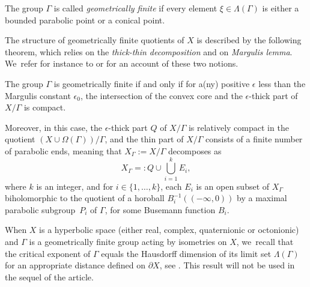 \begin{definition}
The group $\Gamma$ is called \textit{geometrically finite} if every element $\xi\in\Lambda(\Gamma)$ is either a bounded parabolic point or a conical point.
\end{definition}

The structure of geometrically finite quotients of $X$ is described by the following theorem, which relies on the \textit{thick-thin decomposition} and on \textit{Margulis lemma}. We~refer for instance to \cite[Ch.\,D]{benedettiLecturesHyperbolicGeometry1992} or \cite[\S 3.5]{bowditchGeometricalFinitenessVariable1995} for an account of these two notions.

\begin{theorem*}
The group $\Gamma$ is geometrically finite if and only if for a(ny) positive $\epsilon$ less than the Margulis constant $\epsilon_0$, the intersection of the convex core and the $\epsilon$-thick part of $X/\Gamma$ is compact.

Moreover, in this case, the $\epsilon$-thick part $Q$ of $X/\Gamma$ is relatively compact in the quotient $\left(X\cup \Omega(\Gamma)\right)/\Gamma$, and the thin part of $X/\Gamma$ consists of a finite number of parabolic ends, meaning that $X_{\Gamma}:=X/\Gamma$ decomposes as
\begin{equation}\label{eq-decompo-GF}
X_{\Gamma} =: Q \cup \bigcup_{i=1}^{k}E_i,
\end{equation}
where $k$ is an integer, and for $i\in \{1,\dots,k\}$, each $E_i$ is an open subset of $X_{\Gamma}$ biholomorphic to the quotient of a horoball $B_i^{-1}((-\infty,0))$ by a maximal parabolic subgroup~$P_i$ of $\Gamma$, for some Busemann function $B_i$.
\end{theorem*}
When $X$ is a hyperbolic space (either real, complex, quaternionic or octonionic) and $\Gamma$ is a geometrically finite group acting by isometries on $X$, we~recall that the critical exponent of $\Gamma$ equals the Hausdorff dimension of its limit set $\Lambda(\Gamma)$ for an appropriate distance defined on $\partial X$, see \cite[Th.\,6.1]{corletteLimitSetsDiscrete1999}. This result will not be used in the sequel of the article.

